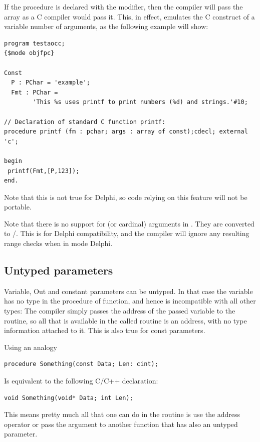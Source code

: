 If the procedure is declared with the  modifier, then the
compiler will pass the array as a C compiler would pass it. This, in effect,
emulates the C construct of a variable number of arguments, as the following
example will show:
\begin{verbatim}
program testaocc;
{$mode objfpc}

Const
  P : PChar = 'example';
  Fmt : PChar =
        'This %s uses printf to print numbers (%d) and strings.'#10;

// Declaration of standard C function printf:
procedure printf (fm : pchar; args : array of const);cdecl; external 'c';

begin
 printf(Fmt,[P,123]);
end.
\end{verbatim}
\begin{remark}
Note that this is not true for Delphi, so code relying on this feature
will not be portable.
\end{remark}

\begin{remark}
Note that there is no support for  (or cardinal) arguments in .
They are converted to /.
This is for Delphi compatibility, and the compiler will ignore any resulting range checks
when in mode Delphi.
\end{remark}

\subsection{Untyped parameters}
Variable, Out and constant parameters can be untyped. In that case the variable has no type
in the procedure of function, and hence is incompatible with all other
types: The compiler simply passes the address of the passed variable to the
routine, so all that is available in the called routine is an address, with
no type information attached to it. This is also true for const parameters.

Using an analogy
\begin{verbatim}
procedure Something(const Data; Len: cint);
\end{verbatim}
Is equivalent to the following C/C++ declaration:
\begin{verbatim}
void Something(void* Data; int Len);
\end{verbatim}
This means pretty much all that one can do in the routine is use the address operator
or pass the argument to another function that has also an untyped parameter.

